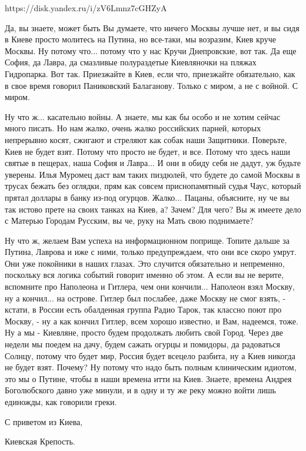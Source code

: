 https://disk.yandex.ru/i/zV6Lmnz7cGHZyA

Да, вы знаете, может быть Вы думаете, что ничего Москвы лучше нет, и вы сидя в
Киеве просто молитесь на Путина, но все-таки, мы возразим, Киев круче Москвы.
Ну потому что... потому что у нас Кручи Днепровские, вот так. Да еще София, да
Лавра, да смазливые полураздетые Киевляночки на пляжах Гидропарка. Вот так.
Приезжайте в Киев, если что, приезжайте обязательно, как в свое время говорил
Паниковский Балаганову. Только с миром, а не с войной. С миром.

Ну что ж... касательно войны. А знаете, мы как бы особо и не хотим сейчас много
писать.  Но нам жалко, очень жалко российских парней, которых непрерывно косят,
сжигают и стреляют как собак наши Защитники. Поверьте, Киев не будет взят.
Потому что просто не будет, и все.  Потому что здесь наши святые в пещерах,
наша София и Лавра... И они в обиду себя не дадут, уж будьте уверены.  Илья
Муромец даст вам таких пиздюлей, что будете до самой Москвы в трусах бежать без
оглядки, прям как совсем приснопамятный судья Чаус, который прятал доллары в
банку из-под огурцов.  Жалко... Пацаны, объясните, ну че вы так истово прете на
своих танках на Киев, а?  Зачем? Для чего? Вы ж имеете дело с Матерью Городам
Русским, вы че, руку на Мать свою поднимаете? 

Ну что ж, желаем Вам успеха на информационном поприще.  Топите дальше за
Путина, Лаврова и иже с ними, только предупреждаем, что они все скоро умрут.
Они уже покойники в наших глазах.  Это случится обязательно и непременно,
поскольку вся логика событий говорит именно об этом.  А если вы не верите,
вспомните про Наполеона и Гитлера, чем они кончили... Наполеон взял Москву, ну
а кончил... на острове. Гитлер был послабее, даже Москву не смог взять, -
кстати, в России есть обалденная группа Радио Тарок, так классно поют про Москву,
- ну а как кончил Гитлер, всем хорошо известно, и Вам, надеемся, тоже.  Ну а мы
- Киевляне, просто будем продолжать любить свой Город. Через две недели мы
поедем на дачу, будем сажать огурцы и помидоры, да радоваться Солнцу, потому
что будет мир, Россия будет всецело разбита, ну а Киев никогда не будет взят.
Почему?  Ну потому что надо быть полным клиническим идиотом, это мы о Путине,
чтобы в наши времена итти на Киев. Знаете, времена Андрея Боголюбского давно
уже минули, и в одну и ту же реку можно войти лишь единожды, как говорили
греки.

С приветом из Киева,

Киевская Крепость.



